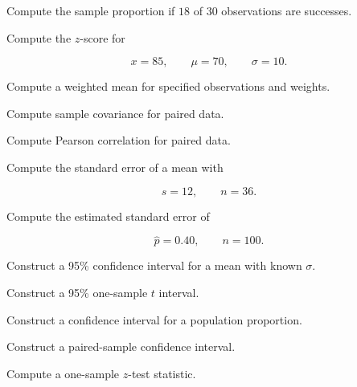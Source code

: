 \begin{exercise}[1]
Compute the sample proportion if \(18\) of \(30\) observations are successes.
\end{exercise}

\begin{exercise}[2]
Compute the \(z\)-score for

\[
x=85,
\qquad
\mu=70,
\qquad
\sigma=10.
\]
\end{exercise}

\begin{exercise}[2]
Compute a weighted mean for specified observations and weights.
\end{exercise}

\begin{exercise}[2]
Compute sample covariance for paired data.
\end{exercise}

\begin{exercise}[2]
Compute Pearson correlation for paired data.
\end{exercise}

\begin{exercise}[2]
Compute the standard error of a mean with

\[
s=12,
\qquad
n=36.
\]
\end{exercise}

\begin{exercise}[2]
Compute the estimated standard error of

\[
\hat p=0.40,
\qquad
n=100.
\]
\end{exercise}

\begin{exercise}[2]
Construct a 95\% confidence interval for a mean with known \(\sigma\).
\end{exercise}

\begin{exercise}[2]
Construct a 95\% one-sample \(t\) interval.
\end{exercise}

\begin{exercise}[2]
Construct a confidence interval for a population proportion.
\end{exercise}

\begin{exercise}[2]
Construct a paired-sample confidence interval.
\end{exercise}

\begin{exercise}[2]
Compute a one-sample \(z\)-test statistic.
\end{exercise}

